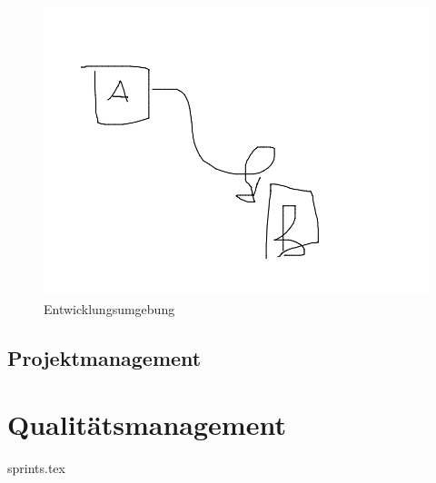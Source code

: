 \begin{figure}[H]
	\centering
	\includegraphics[width=\linewidth]{fig/entwicklungsumgebung}
	\caption{Entwicklungsumgebung}
	\label{fig:pm:entwicklungsumgebung}
\end{figure}

\section{Projektmanagement}

\chapter{Qualitätsmanagement}

\xxx

{sprints.tex}
